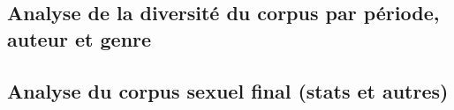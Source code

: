 \subsection{Analyse de la diversité du corpus par période, auteur et genre}


\subsection{Analyse du corpus sexuel final (stats et autres)}
